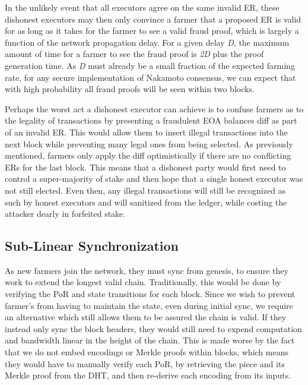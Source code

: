 \documentclass[conference]{IEEEtran}
\begin{document}
In the unlikely event that all executors agree on the same invalid ER, these dishonest executors may then only convince a farmer that a proposed ER is valid for as long as it takes for the farmer to see a valid fraud proof, which is largely a function of the network propagation delay. For a given delay \textit{D}, the maximum amount of time for a farmer to see the fraud proof is \textit{2D} plus the proof generation time. As \textit{D} must already be a small fraction of the expected farming rate, for any secure implementation of Nakamoto consensus, we can expect that with high probability all fraud proofs will be seen within two blocks. 

Perhaps the worst act a dishonest executor can achieve is to confuse farmers as to the legality of transactions by presenting a fraudulent EOA balances diff as part of an invalid ER. This would allow them to insert illegal transactions into the next block while preventing many legal ones from being selected. As previously mentioned, farmers only apply the diff optimistically if there are no conflicting ERs for the last block. This means that a dishonest party would first need to control a super-majority of stake and then hope that a single honest executor was not still elected. Even then, any illegal transactions will still be recognized as such by honest executors and will sanitized from the ledger, while costing the attacker dearly in forfeited stake. 

\subsection{Sub-Linear Synchronization}

As new farmers join the network, they must sync from genesis, to ensure they work to extend the longest valid chain. Traditionally, this would be done by verifying the PoR and state transitions for each block. Since we wish to prevent farmer's from having to maintain the state, even during initial sync, we require an alternative which still allows them to be assured the chain is valid. If they instead only sync the block headers, they would still need to expend computation and bandwidth linear in the height of the chain. This is made worse by the fact that we do not embed encodings or Merkle proofs within blocks, which means they would have to manually verify each PoR, by retrieving the piece and its Merkle proof from the DHT, and then re-derive each encoding from its inputs. 
\end{document}
